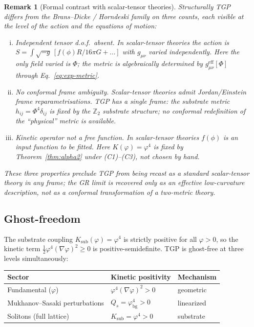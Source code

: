 \documentclass[11pt,a4paper]{article}
\renewcommand{\Phi}{\varPhi}
\newcommand{\Zp}{\mathbb{Z}_{2}}
\newtheorem{remark}[axiom]{Remark}
\begin{document}
\begin{remark}[Formal contrast with scalar-tensor theories]\label{rem:ST-formal}
Structurally TGP differs from the Brans--Dicke / Horndeski family on three
counts, each visible at the level of the action and the equations of
motion:
\begin{enumerate}[(i),nosep]
  \item \emph{Independent tensor d.o.f.\ absent.} In scalar-tensor
    theories the action is $S=\int\sqrt{-g}\,[f(\phi)R/16\pi G+\ldots]$
    with $g_{\mu\nu}$ varied independently. Here the only field varied
    is $\Phi$; the metric is algebraically determined by
    $g_{\mu\nu}^{\mathrm{eff}}[\Phi]$ through Eq.~\eqref{eq:exp-metric}.
  \item \emph{No conformal frame ambiguity.} Scalar-tensor theories
    admit Jordan/Einstein frame reparametrisations. TGP has a single
    frame: the substrate metric $h_{ij}=\Phi^{4}\delta_{ij}$ is fixed by
    the $\Zp$ substrate structure; no conformal redefinition of the
    ``physical'' metric is available.
  \item \emph{Kinetic operator not a free function.} In scalar-tensor
    theories $f(\phi)$ is an input function to be fitted. Here
    $K(\varphi)=\varphi^{4}$ is fixed by
    Theorem~\ref{thm:alpha2} under (C1)--(C3), not chosen by hand.
\end{enumerate}
These three properties preclude TGP from being recast as a standard
scalar-tensor theory in any frame; the GR limit is recovered only as an
effective low-curvature description, not as a conformal transformation
of a two-metric theory.
\end{remark}

\subsection{Ghost-freedom}\label{ssec:ghost}

The substrate coupling $K_{\mathrm{sub}}(\varphi)=\varphi^{4}$ is
strictly positive for all $\varphi>0$, so the kinetic term
$\tfrac{1}{2}\varphi^{4}(\nabla\varphi)^{2}\geq 0$ is positive-semidefinite.
TGP is ghost-free at three levels simultaneously:

\begin{center}\small
\begin{tabular}{@{}lll@{}}
\toprule
\textbf{Sector} & \textbf{Kinetic positivity} & \textbf{Mechanism}\\
\midrule
Fundamental ($\varphi$) & $\varphi^{4}(\nabla\varphi)^{2}>0$ & geometric\\
Mukhanov--Sasaki perturbations & $Q_{s}=\varphi_{\mathrm{bg}}^{4}>0$ & linearized\\
Solitons (full lattice) & $K_{\mathrm{sub}}=\varphi^{4}>0$ & substrate\\
\bottomrule
\end{tabular}
\end{center}
\end{document}
